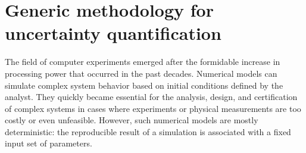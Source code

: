 \section*{Generic methodology for uncertainty quantification} 

The field of computer experiments emerged after the formidable increase in processing power that occurred in the past decades. 
Numerical models can simulate complex system behavior based on initial conditions defined by the analyst. 
They quickly became essential for the analysis, design, and certification of complex systems in cases where experiments or physical measurements are too costly or even unfeasible. 
However, such numerical models are mostly deterministic: the reproducible result of a simulation is associated with a fixed input set of parameters. 

